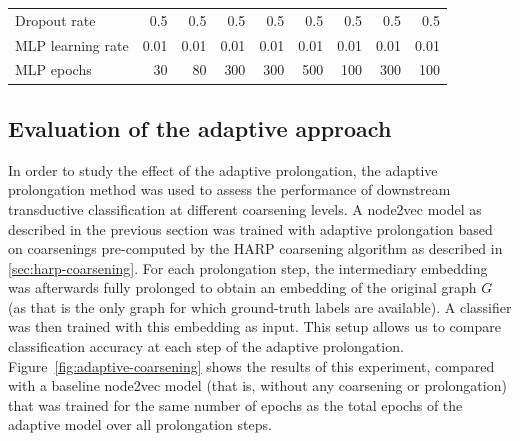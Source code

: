\begin{table}
\begin{adjustbox}{max width=\textwidth}
\begin{tabular}{lrrrrrrrr}
      Dropout rate             & 0.5           & 0.5               & 0.5             & 0.5           & 0.5             & 0.5           & 0.5            & 0.5               \\
      MLP learning rate        & 0.01          & 0.01              & 0.01            & 0.01          & 0.01            & 0.01          & 0.01           & 0.01              \\
      MLP epochs               & 30            & 80                & 300             & 300           & 500             & 100           & 300            & 100               \\
      \bottomrule
    \end{tabular}
  \end{adjustbox}
\end{table}

\subsection{Evaluation of the adaptive approach}\label{sec:adaptive-experiments}

In order to study the effect of the adaptive prolongation, the adaptive prolongation method was used to assess the performance of downstream transductive classification at different coarsening levels. A node2vec model as described in the previous section was trained with adaptive prolongation based on coarsenings pre-computed by the HARP coarsening algorithm as described in \ref{sec:harp-coarsening}. For each prolongation step, the intermediary embedding was afterwards fully prolonged to obtain an embedding of the original graph \( G \) (as that is the only graph for which ground-truth labels are available). A classifier was then trained with this embedding as input. This setup allows us to compare classification accuracy at each step of the adaptive prolongation. Figure~\ref{fig:adaptive-coarsening} shows the results of this experiment, compared with a baseline node2vec model (that is, without any coarsening or prolongation) that was trained for the same number of epochs as the total epochs of the adaptive model over all prolongation steps.

